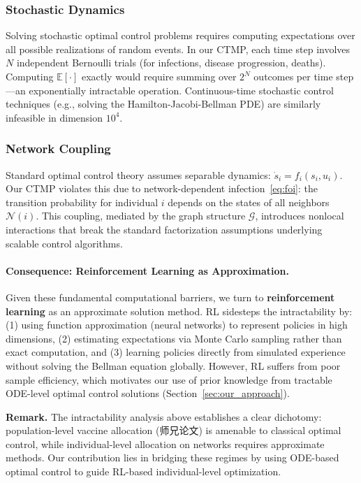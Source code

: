 \subsubsection{Stochastic Dynamics}

Solving stochastic optimal control problems requires computing expectations over
all possible realizations of random events. In our CTMP, each time step involves
$N$ independent Bernoulli trials (for infections, disease progression, deaths).
Computing $\mathbb{E}[\cdot]$ exactly would require summing over $2^N$ outcomes per
time step—an exponentially intractable operation. Continuous-time stochastic control
techniques (e.g., solving the Hamilton-Jacobi-Bellman PDE) are similarly infeasible
in dimension $10^4$.

\subsubsection{Network Coupling}

Standard optimal control theory assumes separable dynamics: $\dot{s}_i = f_i(s_i, u_i)$.
Our CTMP violates this due to network-dependent infection~\eqref{eq:foi}: the transition
probability for individual $i$ depends on the states of all neighbors $\mathcal{N}(i)$.
This coupling, mediated by the graph structure $\mathcal{G}$, introduces nonlocal
interactions that break the standard factorization assumptions underlying scalable
control algorithms.

\paragraph{Consequence: Reinforcement Learning as Approximation.}
Given these fundamental computational barriers, we turn to \textbf{reinforcement learning}
as an approximate solution method. RL sidesteps the intractability by:
(1) using function approximation (neural networks) to represent policies in high dimensions,
(2) estimating expectations via Monte Carlo sampling rather than exact computation,
and (3) learning policies directly from simulated experience without solving the
Bellman equation globally. However, RL suffers from poor sample efficiency, which
motivates our use of prior knowledge from tractable ODE-level optimal control
solutions (Section~\ref{sec:our_approach}).

\vspace{1em}
\noindent\textbf{Remark.}
The intractability analysis above establishes a clear dichotomy: population-level
vaccine allocation (师兄论文) is amenable to classical optimal control, while
individual-level allocation on networks requires approximate methods. Our contribution
lies in bridging these regimes by using ODE-based optimal control to guide RL-based
individual-level optimization.

